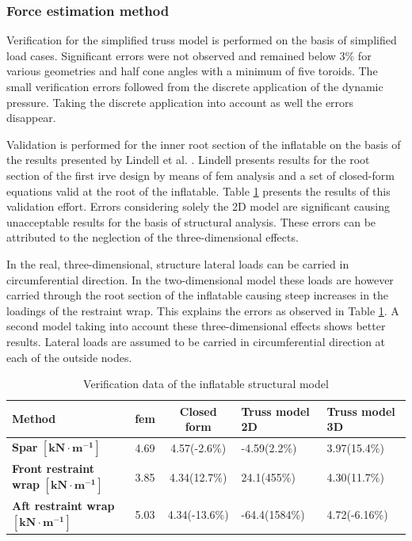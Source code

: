 \subsubsection{Force estimation method}

Verification for the simplified truss model is performed on the basis of simplified load cases. Significant errors were not observed and remained below $3\%$ for various geometries and half cone angles with a minimum of five toroids. The small verification errors followed from the discrete application of the dynamic pressure. Taking the discrete application into account as well the errors disappear.

Validation is performed for the inner root section of the inflatable on the basis of the results presented by Lindell et al. \cite{Lindell2006}. Lindell presents results for the root section of the first \gls{irve} design by means of \gls{fem} analysis and a set of closed-form equations valid at the root of the inflatable. Table \ref{tab:struc_val} presents the results of this validation effort. Errors considering solely the 2D model are significant causing unacceptable results for the basis of structural analysis. These errors can be attributed to the neglection of the three-dimensional effects. 

In the real, three-dimensional, structure lateral loads can be carried in circumferential direction. In the two-dimensional model these loads are however carried through the root section of the inflatable causing steep increases in the loadings of the restraint wrap. This explains the errors as observed in Table \ref{tab:struc_val}. A second model taking into account these three-dimensional effects shows better results. Lateral loads are assumed to be carried in circumferential direction at each of the outside nodes. 

\begin{table}[h]
\centering
\caption{Verification data of the inflatable structural model}
\begin{tabular}{|p{3.6cm}||c|c|p{2.5cm}|p{2.5cm}|} \hline
\textbf{Method}                            & \gls{fem} \cite{Lindell2006} & Closed form \cite{Lindell2006} & Truss model 2D & Truss model 3D \\ \hline
\textbf{Spar} $\mathbf{[kN\cdot m^{-1}]}$& 4.69                     & 4.57(-2.6\%)                     & -4.59(2.2\%)   & 3.97(15.4\%)   \\ \hline
\textbf{Front restraint wrap} $\mathbf{[kN\cdot m^{-1}]}$& 3.85                     & 4.34(12.7\%)                     & 24.1(455\%)    & 4.30(11.7\%)   \\ \hline
\textbf{Aft restraint wrap} $\mathbf{[kN\cdot m^{-1}]}$& 5.03                     & 4.34(-13.6\%)                    & -64.4(1584\%)  & 4.72(-6.16\%) \\ \hline
\end{tabular}
\label{tab:struc_val} 
\end{table}

